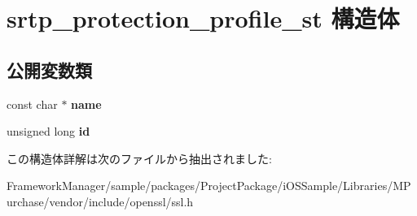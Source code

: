 \hypertarget{structsrtp__protection__profile__st}{}\section{srtp\+\_\+protection\+\_\+profile\+\_\+st 構造体}
\label{structsrtp__protection__profile__st}
\subsection*{公開変数類}
\begin{DoxyCompactItemize}
\item 
\hypertarget{structsrtp__protection__profile__st_a395750555b1a21494c68b99bea8067e8}{}const char $\ast$ {\bfseries name}\label{structsrtp__protection__profile__st_a395750555b1a21494c68b99bea8067e8}

\item 
\hypertarget{structsrtp__protection__profile__st_a8befcbb11f8a31c6a75e8d44e5618a00}{}unsigned long {\bfseries id}\label{structsrtp__protection__profile__st_a8befcbb11f8a31c6a75e8d44e5618a00}

\end{DoxyCompactItemize}


この構造体詳解は次のファイルから抽出されました\+:\begin{DoxyCompactItemize}
\item 
Framework\+Manager/sample/packages/\+Project\+Package/i\+O\+S\+Sample/\+Libraries/\+M\+Purchase/vendor/include/openssl/ssl.\+h\end{DoxyCompactItemize}
